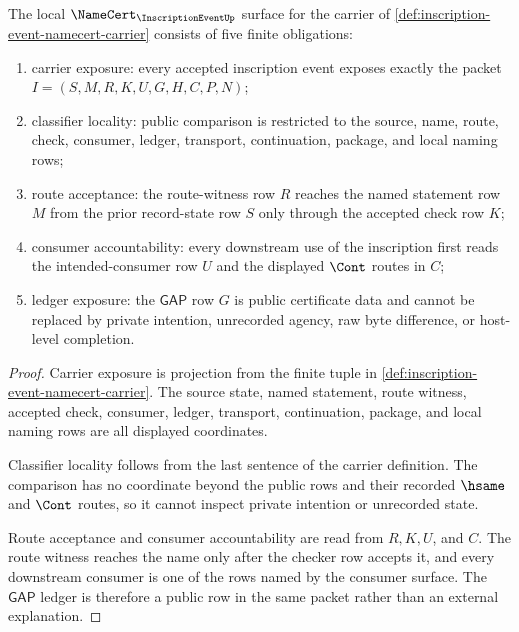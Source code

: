 \begin{theorem}
\label{thm:inscription-event-namecert-obligations}
The local $\NameCert_{\InscriptionEventUp}$ surface for the carrier of \autoref{def:inscription-event-namecert-carrier} consists of five finite obligations:
\begin{enumerate}
\item carrier exposure: every accepted inscription event exposes exactly the packet $I=(S,M,R,K,U,G,H,C,P,N)$;
\item classifier locality: public comparison is restricted to the source, name, route, check, consumer, ledger, transport, continuation, package, and local naming rows;
\item route acceptance: the route-witness row $R$ reaches the named statement row $M$ from the prior record-state row $S$ only through the accepted check row $K$;
\item consumer accountability: every downstream use of the inscription first reads the intended-consumer row $U$ and the displayed $\Cont$ routes in $C$;
\item ledger exposure: the $\mathsf{GAP}$ row $G$ is public certificate data and cannot be replaced by private intention, unrecorded agency, raw byte difference, or host-level completion.
\end{enumerate}
\end{theorem}
\begin{proof}
Carrier exposure is projection from the finite tuple in \autoref{def:inscription-event-namecert-carrier}. The source state, named statement, route witness, accepted check, consumer, ledger, transport, continuation, package, and local naming rows are all displayed coordinates.

Classifier locality follows from the last sentence of the carrier definition. The comparison has no coordinate beyond the public rows and their recorded $\hsame$ and $\Cont$ routes, so it cannot inspect private intention or unrecorded state.

Route acceptance and consumer accountability are read from $R,K,U$, and $C$. The route witness reaches the name only after the checker row accepts it, and every downstream consumer is one of the rows named by the consumer surface. The $\mathsf{GAP}$ ledger is therefore a public row in the same packet rather than an external explanation.
\end{proof}

